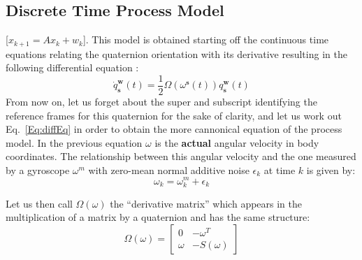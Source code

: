 \documentclass[a4paper,10pt]{article}
\DeclareMathOperator{\sensor}{\mathbf{s}}
\DeclareMathOperator{\world}{\mathbf{w}}
\begin{document}
\subsection{\textbf{Discrete Time Process Model}} 
[$x_{k+1} = Ax_k + w_k$]. This model is obtained starting off the continuous time equations relating the quaternion orientation with its derivative resulting in the following differential equation \cite{Trawny2005}: 
 \begin{equation}
  \dot{q}^{\world}_{\sensor}(t) = \frac{1}{2}\Omega(\omega^{\sensor}(t))q^{\world}_{\sensor}(t)
  \label{Eq:diffEq}
 \end{equation}
 From now on, let us forget about the super and subscript identifying the reference frames for this quaternion for the sake of clarity, and let us work out Eq.~\ref{Eq:diffEq} in order to obtain the more cannonical equation of the process model. In the previous equation $\omega$ is the \textbf{actual} angular velocity in body coordinates. The relationship between this angular velocity and the one measured by a gyroscope $\omega^m$ with zero-mean normal additive noise $\epsilon_k$ at time $k$ is given by:
  \begin{equation}
   \omega_k = \omega^m_k + \epsilon_k
  \end{equation} 
  
  Let us then call $\Omega(\omega)$ the ``derivative matrix'' which appears in the multiplication of a matrix by a quaternion and has the same structure:
  \begin{equation}
  \Omega(\omega)=
     \left[\begin{array}{cc}
         0      & -\omega^T  \\
       \omega   & -S(\omega)
    \end{array}  \right]
  \end{equation}
\end{document}
